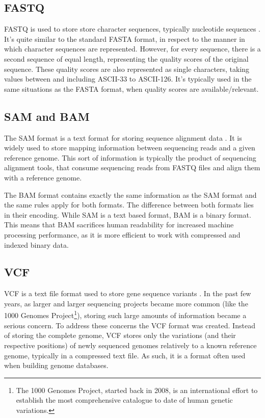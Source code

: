 \subsection{FASTQ}

FASTQ is used to store store character sequences, typically nucleotide sequences
\cite{Cock2010}. It's quite similar to the standard FASTA format, in respect to
the manner in which character sequences are represented. However, for every
sequence, there is a second sequence of equal length, representing the quality
scores of the original sequence. These quality scores are also represented as
single characters, taking values between and including ASCII-33 to ASCII-126.
It's typically used in the same situations as the FASTA format, when quality
scores are available/relevant.

\subsection{SAM and BAM}

The SAM format is a text format for storing sequence alignment data
\cite{genome:sam}. It is widely used to store mapping information between
sequencing reads and a given reference genome. This sort of information is
typically the product of sequencing alignment tools, that consume sequencing
reads from FASTQ files and align them with a reference genome.

The BAM format contains exactly the same information as the SAM format and the
same rules apply for both formats. The difference between both formats lies in
their encoding. While SAM is a text based format, BAM is a binary format. This
means that BAM sacrifices human readability for increased machine processing
performance, as it is more efficient to work with compressed and indexed binary
data.

\subsection{VCF}

VCF is a text file format used to store gene sequence variants \cite{smith13}.
In the past few years, as larger and larger \dna{} sequencing projects became
more common (like the 1000 Genomes Project\footnote{The 1000 Genomes Project,
started back in 2008, is an international effort to establish the most
comprehensive catalogue to date of human genetic variations.}), storing such
large amounts of information became a serious concern. To address these concerns
the VCF format was created. Instead of storing the complete genome, VCF stores
only the variations (and their respective positions) of newly sequenced genomes
relatively to a known reference genome, typically in a compressed text file. As
such, it is a format often used when building genome databases.

